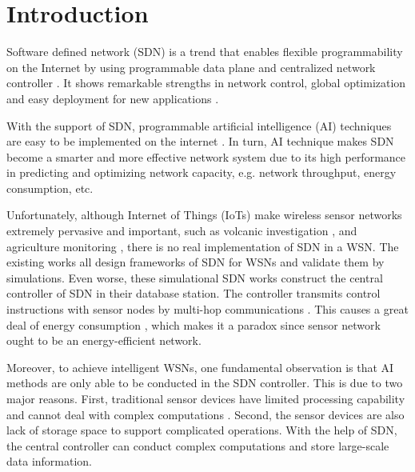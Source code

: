 \section{Introduction}


Software defined network (SDN) \cite{Benzekki2016Software,Sezer2013Are}
is a trend that enables flexible programmability on the Internet 
by using programmable data plane and centralized network controller \cite{7122247}.
It shows remarkable strengths in network control, global optimization
and easy deployment for new applications \cite{Feamster2014The}.

With the support of SDN, programmable artificial intelligence (AI) techniques
\cite{Norvig1995Artificial, Poole2010Artificial, Cockburn1996ARCHON} 
are easy to be implemented on the internet \cite{}.
In turn, AI technique makes SDN become a smarter and more effective network system
due to its high performance in predicting and optimizing network capacity\cite{},
e.g. network throughput, energy consumption, etc.
 
Unfortunately, although Internet of Things (IoTs) \cite{Atzori2010The} 
make wireless sensor networks \cite{Potdar2009Wireless}
extremely pervasive and important, such as volcanic investigation 
\cite{Wernerallen2006Deploying}, and agriculture monitoring \cite{Wang2010L3SN}, 
there is no real implementation of SDN in a WSN. The existing works 
 \cite{mahmud2011exploitation, costanzo2012software, luo2012sensor, de2015tinysdn, galluccio2015sdn} 
all design frameworks of SDN for WSNs and validate them by simulations.  
Even worse, these simulational SDN works construct the central controller 
of SDN in their database station. The controller transmits control 
instructions with sensor nodes by multi-hop communications \cite{Mizuyama2017Estimation}.
This causes a great deal of energy consumption \cite{Yang2014}, which 
makes it a paradox since sensor network ought to be an energy-efficient network.

Moreover, to achieve intelligent WSNs, 
one fundamental observation is that AI methods 
are only able to be conducted in the SDN controller. 
This is due to two major reasons. 
First, traditional sensor devices 
have limited processing capability and cannot 
deal with complex computations \cite{Sharma2012Security,Heller2012The}.
Second, the sensor devices are also lack of storage space 
to support complicated operations. With the help of SDN, 
the central controller can conduct complex computations 
and store large-scale data information.


